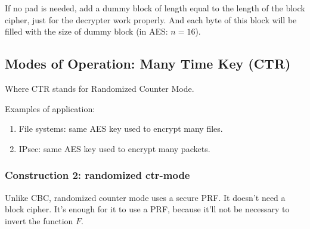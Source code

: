 \documentclass[12pt]{book}
\begin{document}
If no pad is needed, add a dummy block of length equal to the length of the block cipher, just for the decrypter work properly. And each byte of this block will be filled with the size of dummy block (in AES: $n=16$).

\subsection{Modes of Operation: Many Time Key (CTR)}
Where CTR stands for Randomized Counter Mode.

Examples of application:
\begin{enumerate}
	\item File systems: same AES key used to encrypt many files.
	\item IPsec: same AES key used to encrypt many packets.
\end{enumerate}

\subsubsection{Construction 2: randomized ctr-mode}
Unlike CBC, randomized counter mode uses a secure PRF. It doesn't need a block cipher. It's enough for it to use a PRF, because it'll not be necessary to invert the function $F$.
\end{document}
